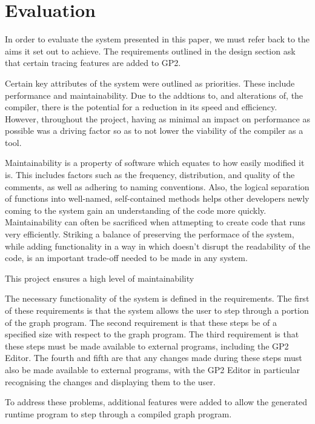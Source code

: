 \documentclass{UoYCSproject}
\begin{document}
\chapter{Evaluation}

In order to evaluate the system presented in this paper, we must refer back to the aims it set out to achieve. The requirements outlined in the design section ask that certain tracing features are added to GP2. 

Certain key attributes of the system were outlined as priorities. These include performance and maintainability.
Due to the addtions to, and alterations of, the compiler, there is the potential for a reduction in its speed and efficiency. However, throughout the project, having as minimal an impact on performance as possible was a driving factor so as to not lower the viability of the compiler as a tool.

Maintainability is a property of software which equates to how easily modified it is. This includes factors such as the frequency, distribution, and quality of the comments, as well as adhering to naming conventions. Also, the logical separation of functions into well-named, self-contained methods helps other developers newly coming to the system gain an understanding of the code more quickly. Maintainability can often be sacrificed when attmepting to create code that runs very efficiently. Striking a balance of preserving the performace of the system, while adding functionality in a way in which doesn't disrupt the readability of the code, is an important trade-off needed to be made in any system.

This project ensures a high level of maintainability %

The necessary functionality of the system is defined in the requirements. The first of these requirements is that the system allows the user to step through a portion of the graph program. The second requirement is that these steps be of a specified size with respect to the graph program. The third requirement is that these steps must be made available to external programs, including the GP2 Editor. The fourth and fifth are that any changes made during these steps must also be made available to external programs, with the GP2 Editor in particular recognising the changes and displaying them to the user.

To address these problems, additional features were added to allow the generated runtime program to step through a compiled graph program. 
\end{document}
